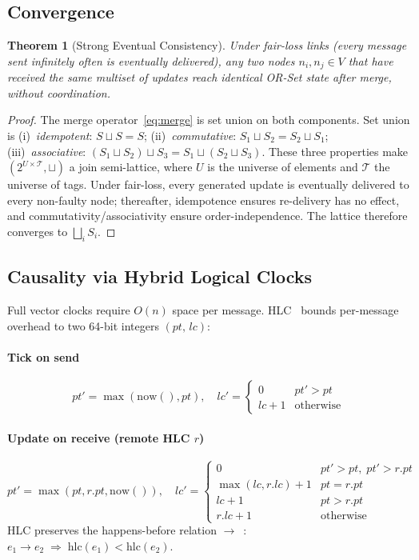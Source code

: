 \documentclass[conference]{IEEEtran}
\newtheorem{theorem}{Theorem}
\begin{document}
\subsection{Convergence}
\begin{theorem}[Strong Eventual Consistency]\label{thm:sec}
Under fair-loss links (every message sent infinitely often is eventually
delivered), any two nodes $n_i, n_j \in V$ that have received the same
multiset of updates reach identical OR-Set state after merge, without
coordination.
\end{theorem}
\begin{proof}
The merge operator~\eqref{eq:merge} is set union on both components.  Set union
is (i)~\emph{idempotent}: $S\sqcup S=S$; (ii)~\emph{commutative}:
$S_1\sqcup S_2=S_2\sqcup S_1$; (iii)~\emph{associative}:
$(S_1\sqcup S_2)\sqcup S_3=S_1\sqcup(S_2\sqcup S_3)$.
These three properties make $(2^{U\times\mathcal{T}},\sqcup)$ a join semi-lattice,
where $U$ is the universe of elements and $\mathcal{T}$ the universe of tags.
Under fair-loss, every generated update is eventually delivered to every
non-faulty node; thereafter, idempotence ensures re-delivery has no effect,
and commutativity/associativity ensure order-independence.  The lattice
therefore converges to $\bigsqcup_i S_i$.
\end{proof}

\subsection{Causality via Hybrid Logical Clocks}
Full vector clocks require $O(n)$ space per message.  HLC~\cite{kulkarni_hlc_2014}
bounds per-message overhead to two 64-bit integers $(pt,\,lc)$:
\paragraph{Tick on send}
\begin{equation}
  pt'=\max(\mathrm{now}(),pt),\quad
  lc'=\begin{cases}0&pt'>pt\\lc+1&\text{otherwise}\end{cases}
\end{equation}
\paragraph{Update on receive (remote HLC $r$)}
\begin{equation}
  pt'=\max(pt,r.pt,\mathrm{now}()),\quad
  lc'=\begin{cases}
    0             &pt'>pt,\;pt'>r.pt\\
    \max(lc,r.lc)+1&pt=r.pt\\
    lc+1          &pt>r.pt\\
    r.lc+1        &\text{otherwise}
  \end{cases}
\end{equation}
HLC preserves the happens-before relation $\rightarrow$~\cite{lamport_time_1978}:
$e_1\rightarrow e_2\;\Rightarrow\;\mathrm{hlc}(e_1)<\mathrm{hlc}(e_2)$.
\end{document}
